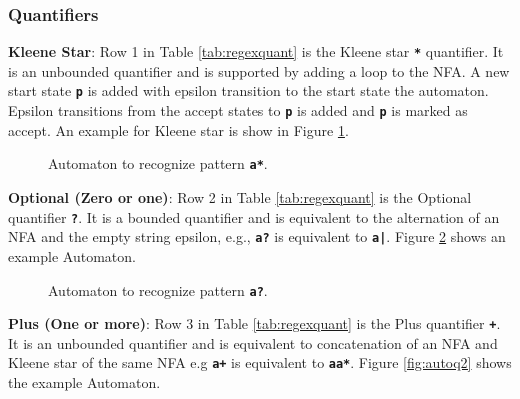 \subsubsection{Quantifiers}
\textbf{Kleene Star}: Row 1 in Table \ref{tab:regexquant} is the Kleene star \texttt{\textbf{*}} quantifier. It is an unbounded quantifier and is supported by adding a loop to the NFA. A new start state \texttt{\textbf{p}} is added with epsilon transition to the start state the automaton. Epsilon transitions from the accept states to \texttt{\textbf{p}} is added and \texttt{\textbf{p}} is marked as accept. An example for Kleene star is show in Figure \ref{fig:autoq1}.

\begin{figure}[H]
\centering
{}
\caption{Automaton to recognize pattern \texttt{\textbf{a*}}.}\label{fig:autoq1}
\end{figure}

\textbf{Optional (Zero or one)}: Row 2 in Table \ref{tab:regexquant} is the Optional quantifier \texttt{\textbf{?}}. It is a bounded quantifier and is  equivalent to the alternation of an NFA and the empty string epsilon, e.g., \texttt{\textbf{a?}} is equivalent to \texttt{\textbf{a|\epsilon}}. Figure \ref{fig:autoq3} shows an example Automaton.


\begin{figure}[htpb]
\centering
{}
\caption{Automaton to recognize pattern \texttt{\textbf{a?}}.}\label{fig:autoq3}
\end{figure}

\noindent
\textbf{Plus (One or more)}: Row 3 in Table \ref{tab:regexquant} is the Plus quantifier \texttt{\textbf{+}}. It is an unbounded quantifier and is equivalent to concatenation of an NFA and Kleene star of the same NFA e.g \texttt{\textbf{a+}} is equivalent to \texttt{\textbf{aa*}}. Figure \ref{fig:autoq2} shows the example Automaton.

